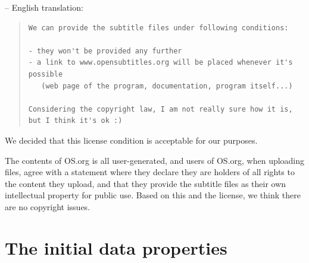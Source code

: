\noindent -- English translation:

\begin{quote}
\begin{verbatim}
We can provide the subtitle files under following conditions:

- they won't be provided any further
- a link to www.opensubtitles.org will be placed whenever it's possible 
   (web page of the program, documentation, program itself...)

Considering the copyright law, I am not really sure how it is, 
but I think it's ok :)
\end{verbatim}
\end{quote}


\noindent We decided that this license condition is acceptable for our purposes. 

The contents of OS.org is all user-generated, and users of OS.org, when uploading files, agree with a statement where they declare they are holders of all rights to the content they upload, and that they provide the subtitle files as their own intellectual property for public use. Based on this and the license, we think there are no copyright issues.%


\section{The initial data properties}
\label{sec:properties}
